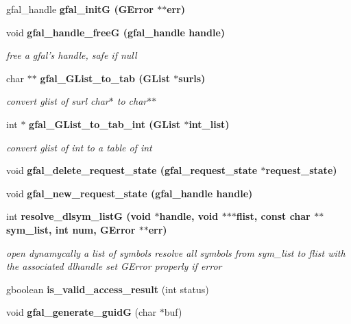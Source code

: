 \begin{CompactItemize}
\item 
gfal\_\-handle \bf{gfal\_\-init\-G} (GError $\ast$$\ast$err)
\item 
void \bf{gfal\_\-handle\_\-free\-G} (gfal\_\-handle handle)\label{gfal__common__internal_8h_9dbd943eaed291897d852fc3ae560058}

\begin{CompactList}\small\item\em free a gfal's handle, safe if null \item\end{CompactList}\item 
char $\ast$$\ast$ \bf{gfal\_\-GList\_\-to\_\-tab} (GList $\ast$surls)
\begin{CompactList}\small\item\em convert glist of surl char$\ast$ to char$\ast$$\ast$ \item\end{CompactList}\item 
int $\ast$ \bf{gfal\_\-GList\_\-to\_\-tab\_\-int} (GList $\ast$int\_\-list)
\begin{CompactList}\small\item\em convert glist of int to a table of int \item\end{CompactList}\item 
void \bf{gfal\_\-delete\_\-request\_\-state} (\bf{gfal\_\-request\_\-state} $\ast$request\_\-state)
\item 
void \bf{gfal\_\-new\_\-request\_\-state} (gfal\_\-handle handle)
\item 
int \bf{resolve\_\-dlsym\_\-list\-G} (void $\ast$handle, void $\ast$$\ast$$\ast$flist, const char $\ast$$\ast$sym\_\-list, int num, GError $\ast$$\ast$err)\label{gfal__common__internal_8h_0323a4ab58106e316851c1ae06148e28}

\begin{CompactList}\small\item\em open dynamycally a list of symbols resolve all symbols from sym\_\-list to flist with the associated dlhandle set GError properly if error \item\end{CompactList}\item 
gboolean \textbf{is\_\-valid\_\-access\_\-result} (int status)\label{gfal__common__internal_8h_aed64917ebc1c60ab8ccd2c4dfbd2c3a}

\item 
void \textbf{gfal\_\-generate\_\-guid\-G} (char $\ast$buf)\label{gfal__common__internal_8h_ba7af0c28514f5d12152018b81478505}

\end{CompactItemize}


